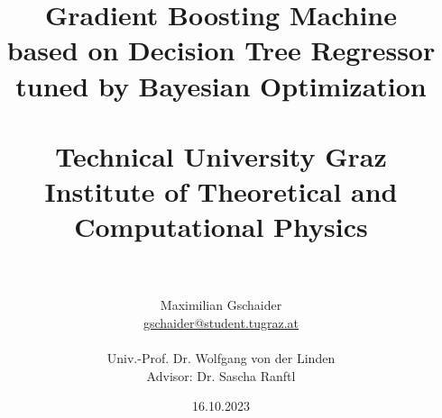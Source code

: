 \documentclass[12pt, a4paper]{article}
\begin{document}
\cfoot*{\pagemark}%

\newpage 
\thispagestyle{empty}

\newpage
\clearpage

\title{
Gradient Boosting Machine \\
based on Decision Tree Regressor \\
\large tuned by Bayesian Optimization \\
\vspace{1cm}\\
\textbf{Technical University Graz}\\
Institute of Theoretical and Computational Physics }
\author{
\\\\Maximilian Gschaider\\ \href{mailto:gschaider@student.tugraz.at}{gschaider@student.tugraz.at} \\
\vspace{1cm}\\
{\small Univ.-Prof. Dr. Wolfgang von der Linden \\
\small Advisor: Dr. Sascha Ranftl} }
\date{16.10.2023}
\maketitle
\newpage
\end{document}
